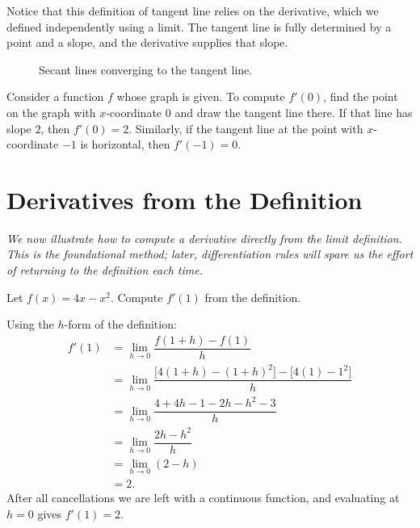\begin{remark}
Notice that this definition of tangent line relies on the derivative, which we defined independently using a limit.  The tangent line is fully determined by a point and a slope, and the derivative supplies that slope.
\end{remark}

\begin{figure}[ht]
  \centering
  
  \caption{Secant lines converging to the tangent line.}
  \label{fig:secant-to-tangent}
\end{figure}

\begin{example}
\label{ex:3-1}
Consider a function $f$ whose graph is given.  To compute $f'(0)$, find the point on the graph with $x$-coordinate $0$ and draw the tangent line there.  If that line has slope $2$, then $f'(0) = 2$.  Similarly, if the tangent line at the point with $x$-coordinate $-1$ is horizontal, then $f'(-1) = 0$.
\end{example}

\section{Derivatives from the Definition}
\label{sec:3.2}

\textit{We now illustrate how to compute a derivative directly from the limit definition.  This is the foundational method; later, differentiation rules will spare us the effort of returning to the definition each time.}

\begin{example}
\label{ex:3-2}
Let $f(x) = 4x - x^{2}$.  Compute $f'(1)$ from the definition.

Using the $h$-form of the definition:
\begin{align*}
  f'(1)
  &= \lim_{h \to 0} \dfrac{f(1+h) - f(1)}{h} \\
  &= \lim_{h \to 0} \dfrac{\bigl[4(1+h) - (1+h)^{2}\bigr] - \bigl[4(1) - 1^{2}\bigr]}{h} \\
  &= \lim_{h \to 0} \dfrac{4 + 4h - 1 - 2h - h^{2} - 3}{h} \\
  &= \lim_{h \to 0} \dfrac{2h - h^{2}}{h} \\
  &= \lim_{h \to 0} (2 - h) \\
  &= 2.
\end{align*}
After all cancellations we are left with a continuous function, and evaluating at $h = 0$ gives $f'(1) = 2$.
\end{example}

